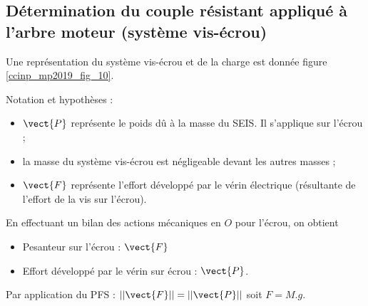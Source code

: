 \subsection{Détermination du couple résistant appliqué à l’arbre moteur (système vis-écrou)}
\ifprof
\else
 Une représentation du système vis-écrou et de la charge est donnée figure \ref{ccinp_mp2019_fig_10}.


\begin{minipage}[c]{.47\linewidth}
\begin{center}
\end{center}
\end{minipage} \hfill
\begin{minipage}[c]{.47\linewidth}
 Notation et hypothèses :
 \begin{itemize}
 \item $\vect{P}$ représente le poids dû à la masse du SEIS. Il s’applique sur l’écrou ;
\item la masse du système vis-écrou est négligeable devant les autres masses ;
\item $\vect{F}$ représente l’effort développé par le vérin électrique (résultante de l’effort de 
la vis sur l’écrou).
\end{itemize}
\end{minipage}
\fi

\ifprof
\begin{corrige}%
En effectuant un bilan des actions mécaniques en $O$ pour l’écrou, on obtient 
\begin{itemize}
\item 	Pesanteur sur l'écrou : $\vect{F}$
\item 	Effort développé par le vérin sur écrou : $\vect{P}$.
\end{itemize}

Par application du PFS : $||\vect{F}|| =||\vect{P}||$  soit $F=M.g$.

\end{corrige}
\else
\fi

